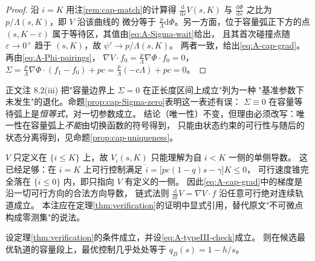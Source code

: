 \begin{proof}
沿 $i=K$ 用注\ref{rem:cap-match}的计算得 $\frac{\mathrm{d}}{\mathrm{d}s}V(s,K)$
与 $\frac{\mathrm{d}\Phi}{\mathrm{d}s}$ 之比为 $p/\Lambda(s,K)$，即 $V$ 沿该曲线的
微分等于 $\frac{p}{\Lambda}\mathrm{d}\Phi$。另一方面，位于容量弧正下方的点
$(s,K-\varepsilon)$ 属于等待区，其值由\eqref{eq:A-Sigma-wait}给出，
且其首次碰撞点随 $\varepsilon\to0^+$ 趋于 $(s,K)$，故 $\psi'\to p/\Lambda(s,K)$。
两者一致，给出\eqref{eq:A-cap-grad}。再由\eqref{eq:A-Phi-pairings}，
$\nabla V\cdot f_0=\frac{p}{\Lambda}\nabla\Phi\cdot f_0=0$，
$\Sigma=\frac{p}{\Lambda}\nabla\Phi\cdot(f_1-f_0)+pc=\frac{p}{\Lambda}(-c\Lambda)+pc=0$。
\end{proof}

\begin{remark}
\label{rem:correct-8.2}
正文注 8.2(iii) 把"容量边界上 $\Sigma=0$ 在正长度区间上成立"列为一种
"基准参数下未发生"的退化。命题\ref{prop:cap-Sigma-zero}表明这一表述有误：
$\Sigma\equiv0$ 在容量等待弧上是\emph{恒等式}，对一切参数成立。
结论（唯一性）不变，但理由必须改写：唯一性在容量弧上\emph{不能}由切换函数的符号得到，
只能由状态约束的可行性与随后的状态分离得到，见命题\ref{prop:cap-uniqueness}。
\end{remark}

\begin{remark}[单侧可微性]
\label{rem:one-sided}
$V$ 只定义在 $\{i\le K\}$ 上，故 $V_i(s,K)$ 只能理解为自 $i<K$ 一侧的单侧导数。
这已经足够：在 $i=K$ 上可行控制满足 $\dot i=\bigl[pc(1-q)s-\gamma\bigr]K\le0$，
可行速度锥完全落在 $\{\dot i\le 0\}$ 内，即只指向 $V$ 有定义的一侧。
因此\eqref{eq:A-cap-grad}中的梯度是沿一切可行方向的合法方向导数，
链式法则 $\frac{\mathrm{d}}{\mathrm{d}t}V=\nabla V\cdot f$ 沿任意可行绝对连续轨道成立。
本注应在定理\ref{thm:verification}的证明中显式引用，替代原文"不可微点构成零测集"的说法。
\end{remark}

\begin{proposition}[容量弧上的唯一性]
\label{prop:cap-uniqueness}
设定理\ref{thm:verification}的条件成立，并设\eqref{eq:A-typeIII-check}成立。
则在候选最优轨道的容量段上，最优控制几乎处处等于 $q_B(s)=1-h/s$。
\end{proposition}

